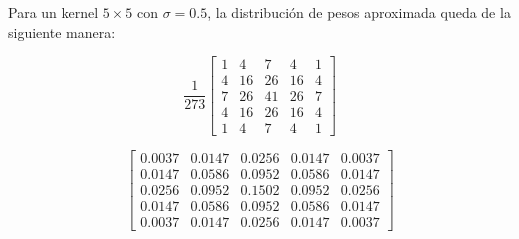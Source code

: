 Para un kernel \(5 \times 5\) con \(\sigma = 0.5\), la distribución de pesos aproximada queda de la siguiente manera:

\[
\frac{1}{273}
\begin{bmatrix}
1 & 4 & 7 & 4 & 1 \\
4 & 16 & 26 & 16 & 4 \\
7 & 26 & 41 & 26 & 7 \\
4 & 16 & 26 & 16 & 4 \\
1 & 4 & 7 & 4 & 1
\end{bmatrix}
\]

\[
\begin{bmatrix}
0.0037 & 0.0147 & 0.0256 & 0.0147 & 0.0037 \\
0.0147 & 0.0586 & 0.0952 & 0.0586 & 0.0147 \\
0.0256 & 0.0952 & 0.1502 & 0.0952 & 0.0256 \\
0.0147 & 0.0586 & 0.0952 & 0.0586 & 0.0147 \\
0.0037 & 0.0147 & 0.0256 & 0.0147 & 0.0037
\end{bmatrix}
\]
